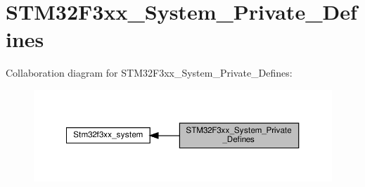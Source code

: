 \hypertarget{group__STM32F3xx__System__Private__Defines}{}\section{S\+T\+M32\+F3xx\+\_\+\+System\+\_\+\+Private\+\_\+\+Defines}
\label{group__STM32F3xx__System__Private__Defines}
Collaboration diagram for S\+T\+M32\+F3xx\+\_\+\+System\+\_\+\+Private\+\_\+\+Defines\+:\nopagebreak
\begin{figure}[H]
\begin{center}
\leavevmode
\includegraphics[width=350pt]{group__STM32F3xx__System__Private__Defines}
\end{center}
\end{figure}
